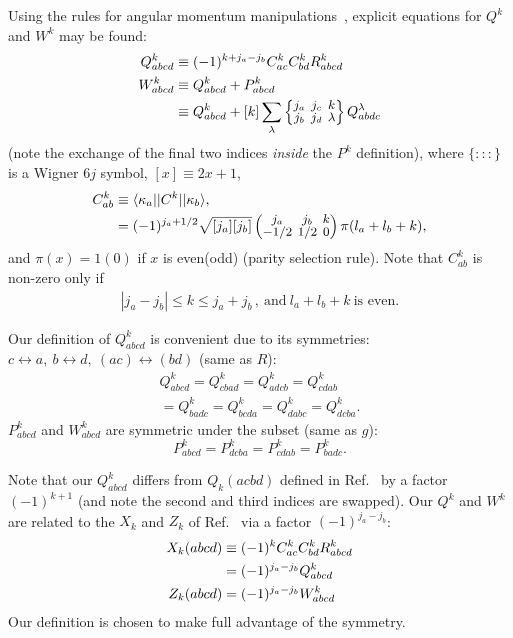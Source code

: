 \documentclass[10pt,twocolumn,a4paper]{article}%
\newcommand{\bra}[1]{\ensuremath{\langle #1|}}	%
\newcommand{\ket}[1]{\ensuremath{|#1\rangle}}
\newcommand{\threej}[6]{
\renewcommand\arraystretch{0.75}\setlength\arraycolsep{2pt}
\small\ensuremath{\begin{pmatrix}#1&#2&#3\\#4&#5&#6\end{pmatrix}}
}	%
\newcommand{\sixj}[6]{\renewcommand\arraystretch{0.75}\setlength\arraycolsep{2pt}\small\ensuremath{\begin{Bmatrix}#1&#2&#3\\#4&#5&#6\end{Bmatrix}}}	%
\newcommand{\be}{\begin{equation}}
\newcommand{\ee}{\end{equation}}
\renewcommand{\k}{\ensuremath{\kappa}}
\begin{document}
Using the rules for angular momentum manipulations~\cite{Varshalovich1988,Lindgren1986}, explicit equations for $Q^k$ and $W^k$ may be found:
\begin{align}
\label{eq:Qk}
Q^k_{abcd} &\equiv  (-1)^{k + j_a-j_b}C^k_{ac}C^k_{bd} R^k_{abcd}\\
%
%
\label{eq:Wk}
W^k_{abcd} 
& \equiv Q^k_{abcd}  + P^k_{abcd}\\
\label{eq:Pk}
&\equiv Q^k_{abcd} + [k] \sum_\lambda \sixj{j_a}{j_c}{k}{j_b}{j_d}{\lambda}Q^\lambda_{abdc} 
\end{align}
(note the exchange of the final two indices {\em inside} the $P^k$ definition),
where $\{:::\}$ is a Wigner 6$j$ symbol, $[x]\equiv2x+1$,
\begin{align}
\label{eq:Ckab}
C^k_{ab}&\equiv \bra{\k_a}|C^k|\ket{\k_b} ,\\
&= (-1)^{j_a+1/2}\sqrt{[j_a][j_b]}\threej{j_a}{j_b}{k}{-1/2}{1/2}{0}\pi(l_a+l_b+k) ,
\end{align}
and $\pi(x)=1(0)$ if $x$ is even(odd) (parity selection rule).
Note that $C^k_{ab}$ is non-zero only if 
\begin{align}
|j_a-j_b|\leq k\leq j_a+j_b
\,,~\text{and}~ l_a + l_b + k~\text{is even}.
\end{align}

Our definition of $Q^k_{abcd}$  is convenient due to its symmetries: $c\leftrightarrow a ,~ b\leftrightarrow d  ,~ (ac)\leftrightarrow (bd)$ (same as $R$):
\begin{multline}
 Q^k_{abcd} =Q^k_{cbad} =Q^k_{adcb} =Q^k_{cdab} \\=Q^k_{badc} =Q^k_{bcda} =Q^k_{dabc} =Q^k_{dcba}.
\end{multline}
$P^k_{abcd}$ and $W^k_{abcd}$ are symmetric under the subset (same as $g$):
\be
P^k_{abcd} = P^k_{dcba} = P^k_{cdab} = P^k_{badc}.
\ee
%

Note that our $Q^k_{abcd}$ differs from $Q_k({acbd})$ defined in Ref.~\cite{DzubaHFS1984} by a factor $(-1)^{k+1}$ (and note the second and third indices are swapped).
Our $Q^k$ and $W^k$ are related to the $X_k$ and $Z_k$ of Ref.~\cite{Lindgren1986,JohnsonBook2007} via a 
factor $(-1)^{j_a-j_b}$:
\begin{align}
X_k({abcd}) &\equiv  (-1)^k C^k_{ac}C^k_{bd} R^k_{abcd} \notag\\
  & = (-1)^{j_a-j_b}Q^k_{abcd}\\
 Z_k({abcd}) &=  (-1)^{j_a-j_b} W^k_{abcd}
\end{align}
Our definition is chosen to make full advantage of the symmetry.
\end{document}
